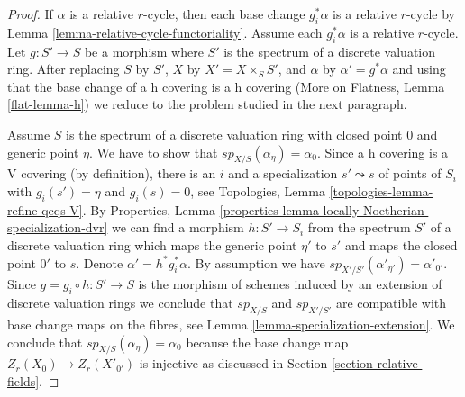 \documentclass{stacks-project}
\theoremstyle{plain}
\theoremstyle{definition}
\theoremstyle{remark}
\numberwithin{equation}{subsection}
\begin{document}
\begin{proof}
If $\alpha$ is a relative $r$-cycle, then each base change $g_i^*\alpha$ is a
relative $r$-cycle by Lemma \ref{lemma-relative-cycle-functoriality}.
Assume each $g_i^*\alpha$ is a relative $r$-cycle.
Let $g : S' \to S$ be a morphism where $S'$ is the spectrum of a discrete
valuation ring. After replacing $S$ by $S'$, $X$ by $X' = X \times_S S'$, and
$\alpha$ by $\alpha' = g^*\alpha$ and using that the base change of a
h covering is a h covering (More on Flatness, Lemma \ref{flat-lemma-h})
we reduce to the problem studied in the next paragraph.

\medskip\noindent
Assume $S$ is the spectrum of a discrete valuation ring with closed
point $0$ and generic point $\eta$. We have to show that
$sp_{X/S}(\alpha_\eta) = \alpha_0$. Since a h covering is a V covering
(by definition), there is an $i$ and a specialization $s' \leadsto s$
of points of $S_i$ with $g_i(s') = \eta$ and $g_i(s) = 0$, see
Topologies, Lemma \ref{topologies-lemma-refine-qcqs-V}. By
Properties, Lemma \ref{properties-lemma-locally-Noetherian-specialization-dvr}
we can find a morphism $h : S' \to S_i$ from the
spectrum $S'$ of a discrete valuation ring which maps
the generic point $\eta'$ to $s'$ and maps
the closed point $0'$ to $s$. Denote $\alpha' = h^*g_i^*\alpha$.
By assumption we have $sp_{X'/S'}(\alpha'_{\eta'}) = \alpha'_{0'}$.
Since $g = g_i \circ h : S' \to S$ is the morphism of schemes
induced by an extension of discrete valuation rings we conclude that
$sp_{X/S}$ and $sp_{X'/S'}$ are compatible with base change maps
on the fibres, see Lemma \ref{lemma-specialization-extension}.
We conclude that $sp_{X/S}(\alpha_\eta) = \alpha_0$ because
the base change map $Z_r(X_0) \to Z_r(X'_{0'})$ is injective
as discussed in Section \ref{section-relative-fields}.
\end{proof}
\end{document}
